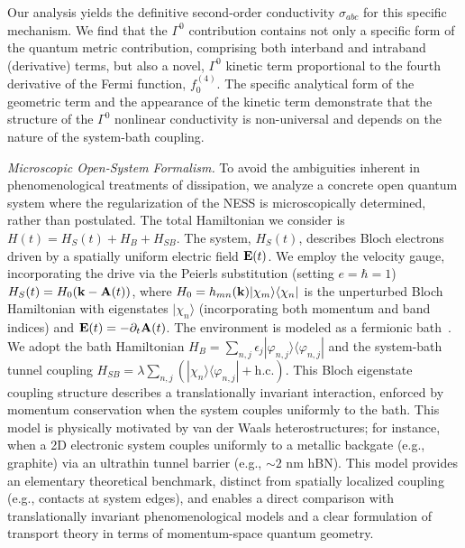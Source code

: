 \documentclass[twocolumn, prx, reprint, amsfonts, amsmath, amssymb, longbibliography, floatfix, aps]{revtex4-2}
\begin{document}
Our analysis yields the definitive second-order conductivity $\sigma_{abc}$ for this specific mechanism.
We find that the $\Gamma^0$ contribution contains not only a specific form of the quantum metric contribution, comprising both interband and intraband (derivative) terms, but also a novel, $\Gamma^0$ kinetic term proportional to the fourth derivative of the Fermi function, $f_0^{(4)}$.
The specific analytical form of the geometric term and the appearance of the kinetic term demonstrate that the structure of the $\Gamma^0$ nonlinear conductivity is non-universal and depends on the nature of the system-bath coupling.

\medskip

\textit{\color{blue}Microscopic Open-System Formalism.} To avoid the ambiguities inherent in phenomenological treatments of dissipation, we analyze a concrete open quantum system where the regularization of the NESS is microscopically determined, rather than postulated. 
The total Hamiltonian we consider is $H(t) = H_S(t) + H_B + H_{SB}$. The system, $H_S(t)$, describes Bloch electrons driven by a spatially uniform electric field ${\bf E}(t)$. We employ the velocity gauge, incorporating the drive via the Peierls substitution (setting $e=\hbar=1$)
$H_S(t) = H_0({\bf k} - {\bf A}(t))$,
where $H_0 = h_{m n}({\bf k}) |\chi_m\rangle \langle\chi_n| $ is the unperturbed Bloch Hamiltonian with eigenstates $|\chi_n\rangle$ (incorporating both momentum and band indices) and ${\bf E}(t) = -\partial_t {\bf A}(t)$.
The environment is modeled as a fermionic bath~\cite{seetharam2015controlled, matsyshyn2023fermi, shi2023berry, matsyshyn2021rabi}. 
We adopt the bath Hamiltonian $H_B = \sum_{n,j}\epsilon_{j}|\varphi_{n,j}\rangle\langle\varphi_{n,j}|$ and the system-bath tunnel coupling $H_{SB} = \lambda\sum_{n,j}(|\chi_{n}\rangle\langle\varphi_{n,j}| + \text{h.c.})$.
This Bloch eigenstate coupling structure describes a translationally invariant interaction, enforced by momentum conservation when the system couples uniformly to the bath.
This model is physically motivated by van der Waals heterostructures; for instance, when a 2D electronic system couples uniformly to a metallic backgate (e.g., graphite) via an ultrathin tunnel barrier (e.g., $\sim 2$ nm hBN).
This model provides an elementary theoretical benchmark, distinct from spatially localized coupling (e.g., contacts at system edges), and enables a direct comparison with translationally invariant phenomenological models and a clear formulation of transport theory in terms of momentum-space quantum geometry.
\end{document}
